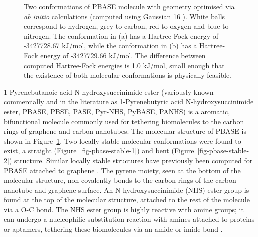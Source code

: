 \documentclass[
  a4paper,
]{scrbook}
\begin{document}
\begin{figure}
\begin{minipage}[t]{0.47\linewidth}
{{}

}

\subcaption{\label{fig-pbase-stable-2}}
\end{minipage}%

\caption{\label{fig-pbase-structure}Two conformations of PBASE molecule
with geometry optimised via \emph{ab initio} calculations (computed
using Gaussian 16 \autocite{g16}). White balls correspond to hydrogen,
grey to carbon, red to oxygen and blue to nitrogen. The conformation in
(a) has a Hartree-Fock energy of -3427728.67 kJ/mol, while the
conformation in (b) has a Hartree-Fock energy of -3427729.66 kJ/mol. The
difference between computed Hartree-Fock energies is 1.0 kJ/mol, small
enough that the existence of both molecular conformations is physically
feasible.}

\end{figure}

1-Pyrenebutanoic acid N-hydroxysuccinimide ester (variously known
commercially and in the literature as 1-Pyrenebutyric acid
N-hydroxysuccinimide ester, PBASE, PBSE, PASE, Pyr-NHS, PyBASE, PANHS)
is a aromatic, bifunctional molecule commonly used for tethering
biomolecules to the carbon rings of graphene and carbon nanotubes. The
molecular structure of PBASE is shown in
Figure~\ref{fig-pbase-structure}. Two locally stable molecular
conformations were found to exist, a straight
(Figure~\ref{fig-pbase-stable-1}) and bent
(Figure~\ref{fig-pbase-stable-2}) structure. Similar locally stable
structures have previously been computed for PBASE attached to graphene
\autocite{Oishi2022}. The pyrene moiety, seen at the bottom of the
molecular structure, non-covalently bonds to the carbon rings of the
carbon nanotube and graphene surface. An N-hydroxysuccinimide (NHS)
ester group is found at the top of the molecular structure, attached to
the rest of the molecule via a O-C bond. The NHS ester group is highly
reactive with amine groups; it can undergo a nucleophilic substitution
reaction with amines attached to proteins or aptamers, tethering these
biomolecules via an amide or imide bond
\autocite{Chen2001,Hermanson2013-16,Hermanson2013-3,Mishyn2022}.
\end{document}
